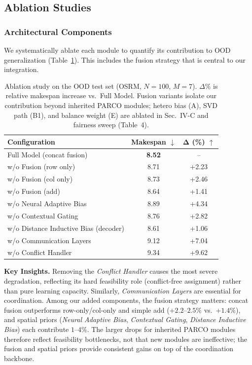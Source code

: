 \documentclass[journal,twoside,web]{ieeecolor}
\theoremstyle{definition}
\theoremstyle{remark}
\theoremstyle{definition}
\begin{document}
\subsection{Ablation Studies}
\subsubsection{Architectural Components}

We systematically ablate each module to quantify its contribution to OOD generalization (Table~\ref{tab:makespan}). This includes the fusion strategy that is central to our integration.

\begin{table}[h]
\centering
\caption{Ablation study on the OOD test set (OSRM, $N{=}100$, $M{=}7$). $\Delta\%$ is relative makespan increase vs.\ Full Model. Fusion variants isolate our contribution beyond inherited PARCO modules; hetero bias (A), SVD path (B1), and balance weight (E) are ablated in Sec.~IV-C and fairness sweep (Table~4).}
\label{tab:makespan}
\begin{tabular}{lcc}
\toprule
\textbf{Configuration} & \textbf{Makespan} $\downarrow$ & $\bm{\Delta}$ \textbf{(\%)} $\uparrow$ \\
\midrule
Full Model (concat fusion) & \textbf{8.52} & -- \\
\midrule
w/o Fusion (row only) & 8.71 & +2.23 \\
w/o Fusion (col only) & 8.73 & +2.46 \\
w/o Fusion (add) & 8.64 & +1.41 \\
\midrule
w/o Neural Adaptive Bias & 8.89 & +4.34 \\
w/o Contextual Gating & 8.76 & +2.82 \\
w/o Distance Inductive Bias (decoder) & 8.61 & +1.06 \\
\midrule
w/o Communication Layers & 9.12 & +7.04 \\
w/o Conflict Handler & 9.34 & +9.62 \\
\bottomrule
\end{tabular}
\end{table}

\noindent\textbf{Key Insights.}
Removing the \emph{Conflict Handler} causes the most severe degradation, reflecting its hard feasibility role (conflict-free assignment) rather than pure learning capacity. Similarly, \emph{Communication Layers} are essential for coordination. Among our added components, the fusion strategy matters: concat fusion outperforms row-only/col-only and simple add ($+2.2$--$2.5\%$ vs.\ $+1.4\%$), and spatial priors (\emph{Neural Adaptive Bias}, \emph{Contextual Gating}, \emph{Distance Inductive Bias}) each contribute $1$--$4\%$. The larger drops for inherited PARCO modules therefore reflect feasibility bottlenecks, not that new modules are ineffective; the fusion and spatial priors provide consistent gains on top of the coordination backbone.
\end{document}
